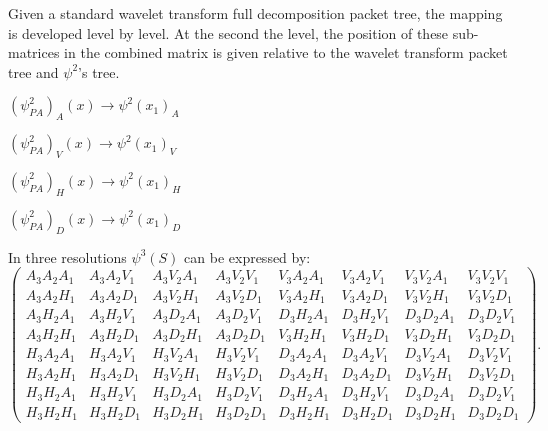Given a standard wavelet transform full decomposition packet tree, the mapping is developed level by level.  At the second the level, the position of these sub-matrices in the combined matrix is given relative to the wavelet transform packet tree and $\psi^2$'s tree.

 $(\psi_{PA}^2)_A(x) \to \psi^2(x_1)_A$
 
$(\psi_{PA}^2)_V(x) \to \psi^2(x_1)_V$
 
$(\psi_{PA}^2)_H(x) \to \psi^2(x_1)_H$
 
$(\psi_{PA}^2)_D(x) \to \psi^2(x_1)_D$
 
 
 In three resolutions $\psi^3(S)$ can be expressed by:
 \[  
\left(
\begin{array}{cccccccc}
A_3A_2 A_1 & A_3 A_2V_1 & A_3  V_2A_1 & A_3 V_2V_1 
	& V_3A_2 A_1 & V_3 A_2V_1 & V_3  V_2A_1 & V_3 V_2V_1 \\
A_3 A_2 H_1 & A_3 A_2D_1 & A_3 V_2H_1 & A_3  V_2D_1
	& V_3 A_2 H_1 & V_3 A_2D_1 & V_3 V_2H_1 & V_3  V_2D_1 \\ 
A_3 H_2 A_1 & A_3 H_2V_1 & A_3 D_2A_1 & A_3 D_2V_1
	& D_3 H_2 A_1 & D_3 H_2V_1 & D_3 D_2A_1 & D_3 D_2V_1 \\ 
A_3 H_2 H_1 & A_3 H_2D_1 & A_3 D_2H_1 & A_3 D_2D_1 
	& V_3 H_2 H_1 & V_3 H_2D_1 & V_3 D_2H_1 & V_3 D_2D_1 \\

H_3 A_2 A_1 & H_3 A_2V_1 & H_3 V_2A_1 & H_3 V_2V_1 
	& D_3 A_2 A_1 & D_3 A_2V_1 & D_3 V_2A_1 & D_3 V_2V_1\\ 
H_3 A_2 H_1 & H_3 A_2D_1 & H_3 V_2H_1 & H_3 V_2D_1
	& D_3 A_2 H_1 & D_3 A_2D_1 & D_3 V_2H_1 & D_3 V_2D_1 \\ 
H_3 H_2 A_1 & H_3 H_2V_1 & H_3 D_2A_1 &  H_3 D_2V_1 
	& D_3 H_2 A_1 & D_3 H_2V_1 & D_3 D_2A_1 & D_3 D_2V_1\\ 
H_3 H_2 H_1 & H_3 H_2D_1 & H_3 D_2H_1 & H_3 D_2D_1 
	& D_3 H_2 H_1 & D_3 H_2D_1 & D_3 D_2H_1 & D_3 D_2D_1
\end{array}
\right).
\]
 